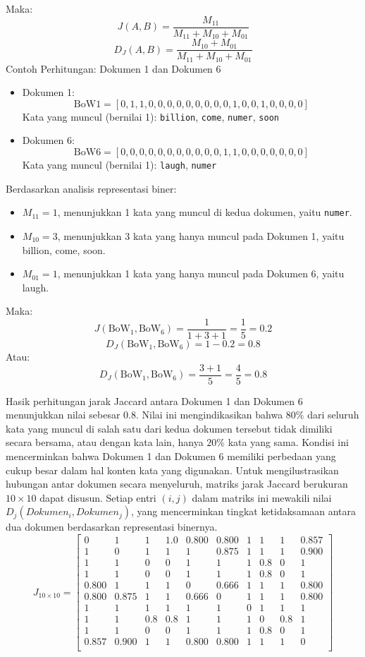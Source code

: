 \documentclass[a4paper,12pt]{report}
\numberwithin{equation}{chapter}
\begin{document}
Maka:
\[
J(A,B) = \frac{M_{11}}{M_{11} + M_{10} + M_{01}}
\]
\[
D_J(A,B) = \frac{M_{10} + M_{01}}{M_{11} + M_{10} + M_{01}}
\]
Contoh Perhitungan: Dokumen 1 dan Dokumen 6
\begin{itemize}
    \item Dokumen 1:
\[
    \text {BoW1} = [0, 1, 1, 0, 0, 0, 0, 0, 0, 0, 0, 0, 1, 0, 0, 1, 0, 0, 0, 0]
\]
Kata yang muncul (bernilai 1): \texttt{billion}, \texttt{come}, \texttt{numer}, \texttt{soon}
\item 
Dokumen 6:
\[
\text {BoW6} = [0, 0, 0, 0, 0, 0, 0, 0, 0, 0, 0, 1, 1, 0, 0, 0, 0, 0, 0, 0]
\]
Kata yang muncul (bernilai 1): \texttt{laugh}, \texttt{numer}
\end{itemize}
Berdasarkan analisis representasi biner:
\begin{itemize}
    \item $M_{11} = 1$, menunjukkan 1 kata yang muncul di kedua dokumen, yaitu \texttt{numer}.
    \item $M_{10} = 3$, menunjukkan 3 kata yang hanya muncul pada Dokumen 1, yaitu billion, come, soon.
    \item $M_{01} = 1$, menunjukkan 1 kata yang hanya muncul pada Dokumen 6, yaitu laugh.
\end{itemize}
Maka:
\[
J(\text{BoW}_1, \text{BoW}_6) = \frac{1}{1 + 3 + 1} = \frac{1}{5} = 0.2
\]
\[
D_J(\text{BoW}_1, \text{BoW}_6) = 1 - 0.2 = 0.8
\]
Atau:
\[
D_J(\text{BoW}_1, \text{BoW}_6) = \frac{3 + 1}{5} = \frac{4}{5} = 0.8
\]

Hasik perhitungan jarak Jaccard antara Dokumen 1 dan Dokumen 6 menunjukkan nilai sebesar $0.8$. Nilai ini mengindikasikan bahwa $80\%$ dari seluruh kata yang muncul di salah satu dari kedua dokumen tersebut tidak dimiliki secara bersama, atau dengan kata lain, hanya $20\%$ kata yang sama. Kondisi ini mencerminkan bahwa Dokumen 1 dan Dokumen 6 memiliki perbedaan yang cukup besar dalam hal konten kata yang digunakan. Untuk mengilustrasikan hubungan antar dokumen secara menyeluruh, matriks jarak Jaccard berukuran $10 \times 10$ dapat disusun. Setiap entri $(i,j)$ dalam matriks ini mewakili nilai $D_j(Dokumen_i, Dokumen_j)$, yang mencerminkan tingkat ketidaksamaan antara dua dokumen berdasarkan representasi binernya.
\[ J_{10 \times 10} =
\begin{bmatrix}
0 & 1 & 1 & 1.0 & 0.800 & 0.800 & 1 & 1 & 1 & 0.857 \\
1 & 0 & 1 & 1 & 1 & 0.875 & 1 & 1 & 1 & 0.900 \\
1 & 1 & 0 & 0 & 1 & 1 & 1 & 0.8 & 0 & 1 \\
1 & 1 & 0 & 0 & 1 & 1 & 1 & 0.8 & 0 & 1 \\
0.800 & 1 & 1 & 1 & 0 & 0.666 & 1 & 1 & 1 & 0.800 \\
0.800 & 0.875 & 1 & 1 & 0.666 & 0 & 1 & 1 & 1 & 0.800 \\
1 & 1 & 1 & 1 & 1 & 1 & 0 & 1 & 1 & 1 \\
1 & 1 & 0.8 & 0.8 & 1 & 1 & 1 & 0 & 0.8 & 1 \\
1 & 1 & 0 & 0 & 1 & 1 & 1 & 0.8 & 0 & 1 \\
0.857 & 0.900 & 1 & 1 & 0.800 & 0.800 & 1 & 1 & 1 & 0 \\
\end{bmatrix}
\]
\end{document}
